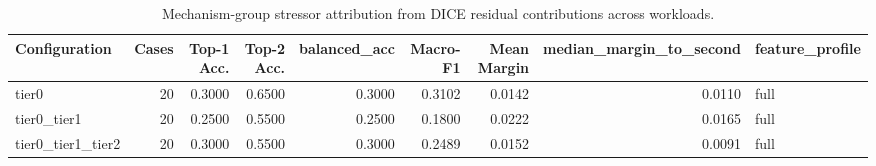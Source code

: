 \begin{table}[t]
\centering
\caption{Mechanism-group stressor attribution from DICE residual contributions across workloads.}
\label{tab:dice_stressor_diagnosis}
\footnotesize
\begin{tabular}{lrrrrrrrl}
\toprule
Configuration & Cases & Top-1 Acc. & Top-2 Acc. & balanced_acc & Macro-F1 & Mean Margin & median_margin_to_second & feature_profile \\
\midrule
tier0 & 20 & 0.3000 & 0.6500 & 0.3000 & 0.3102 & 0.0142 & 0.0110 & full \\
tier0_tier1 & 20 & 0.2500 & 0.5500 & 0.2500 & 0.1800 & 0.0222 & 0.0165 & full \\
tier0_tier1_tier2 & 20 & 0.3000 & 0.5500 & 0.3000 & 0.2489 & 0.0152 & 0.0091 & full \\
\bottomrule
\end{tabular}

\end{table}
